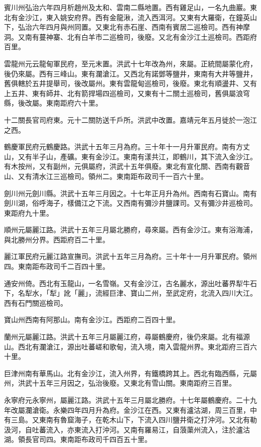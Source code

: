 賓川州弘治六年四月析趙州及太和、雲南二縣地置。西有雞足山，一名九曲巖。東北有金沙江，東入姚安府界。西有金龍湫，流入西洱河。又東有大羅衛，在鐘英山下，弘治六年四月與州同置。又東北有赤石崖、西南有賓居二巡檢司。西有神摩洞。又南有蔓神寨、北有白羊市二巡檢司，後廢。又北有金沙江土巡檢司。西距府百里。

雲龍州元云龍甸軍民府，至元末置。洪武十七年改為州，來屬。正統間屬蒙化府，後仍來屬。西有三峰山。東有瀾滄江。又西北有諾鄧等鹽井，東南有大井等鹽井，舊俱轄於五井提舉司，後改屬州。東有雲龍甸巡檢司，後廢。東北有順盪井、又有上五井、東有師井、北有箭捍場四巡檢司，又東有十二關土巡檢司，舊俱屬浪穹縣，後改屬。東南距府六十里。

十二關長官司府東。元十二關防送千戶所。洪武中改置。嘉靖元年五月徙於一泡江之西。

鶴慶軍民府元鶴慶路。洪武十五年三月為府。三十年十一月升軍民府。南有方丈山，又有半子山，產礦。東有金沙江。東南有漾共江，即鶴川，其下流入金沙江。有木按州，又有副州，元俱屬府，洪武十五年俱廢。東北有宣化關、西南有觀音山、又有清水江三巡檢司。領州二。東南距布政司千一百六十里。

劍川州元劍川縣。洪武十五年三月因之。十七年正月升為州。西南有石寶山。南有劍川湖，俗呼海子，樣備江之下流。又西南有彌沙井鹽課司。又有彌沙井巡檢司。東距府九十里。

順州元屬麗江路。洪武十五年三月屬北勝府，尋來屬。西有金沙江。東有浴海浦，與北勝州分界。西距府百二十里。

麗江軍民府元麗江路宣撫司。洪武十五年三月為府。三十年十一月升軍民府。領州四。東南距布政司千二百四十里。

通安州倚。西北有玉龍山，一名雪嶺。又有金沙江，古名麗水，源出吐蕃界犁牛石下，名犁水，「犁」訛「麗」，流經巨津、寶山二州，至武定府，北流入四川大江。西有石門關巡檢司。

寶山州西南有阿那山。南有金沙江。西距府二百四十里。

蘭州元屬麗江路。洪武十五年三月屬麗江府，尋屬鶴慶府，後仍來屬。北有福源山。西北有瀾滄江，源出吐蕃嵯和歌甸，流入境，南入雲龍州界。東北距府三百六十里。

巨津州南有華馬山。北有金沙江，流入州界，有鐵橋跨其上。西北有臨西縣，元屬州，洪武十五年三月因之，弘治後廢。又東北有雪山關。東南距府三百里。

永寧府元永寧州，屬麗江路。洪武十五年三月屬北勝府。十七年屬鶴慶府。二十九年改屬瀾滄衛。永樂四年四月升為府。金沙江在西。又東有瀘沽湖，周三百里，中有三島。又東南有魯窟海子，在乾木山下，下流入四川鹽井衛之打沖河。又北有勒汲河，自吐蕃流入，亦東流入打沖河。又南有羅易江，自蒗蕖州流入，注於瀘沽湖。領長官司四。東南距布政司千四百五十里。

